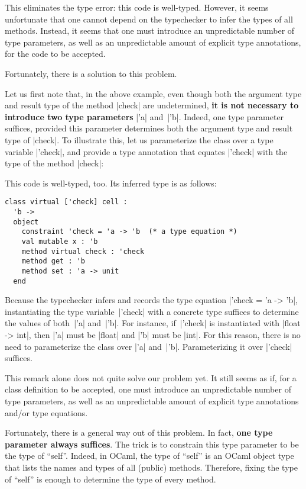 \documentclass[11pt,a4paper,twoside]{article}
\renewcommand{\emph}[1]{\textbf{#1}}
\begin{document}
This eliminates the type error: this code is well-typed. However, it seems
unfortunate that one cannot depend on the typechecker to infer the types of
all methods. Instead, it seems that one must introduce an unpredictable number
of type parameters, as well as an unpredictable amount of explicit type
annotations, for the code to be accepted.

Fortunately, there is a solution to this problem.

Let us first note that, in the above example, even though both the argument
type and result type of the method \oc|check| are undetermined, \emph{it is
  not necessary to introduce two type parameters} \oc|'a| and~\oc|'b|. Indeed,
one type parameter suffices, provided this parameter determines both the
argument type and result type of \oc|check|. To illustrate this, let us
parameterize the class over a type variable \oc|'check|, and provide a type
annotation that equates \oc|'check| with the type of the method \oc|check|:
%

This code is well-typed, too. Its inferred type is as follows:
%
\begin{mdframed}[backgroundcolor=green!10]
\begin{lstlisting}[keywords={}]
class virtual ['check] cell :
  'b ->
  object
    constraint 'check = 'a -> 'b  (* a type equation *)
    val mutable x : 'b
    method virtual check : 'check
    method get : 'b
    method set : 'a -> unit
  end
\end{lstlisting}
\end{mdframed}

Because the typechecker infers and records the type equation %
\oc|'check = 'a -> 'b|, instantiating the type variable~\oc|'check| with a
concrete type suffices to determine the values of both~\oc|'a| and~\oc|'b|.
For instance, if~\oc|'check| is instantiated with \oc|float -> int|, then
\oc|'a| must be \oc|float| and \oc|'b| must be \oc|int|. For this reason,
there is no need to parameterize the class over \oc|'a| and~\oc|'b|.
Parameterizing it over \oc|'check| suffices.

This remark alone does not quite solve our problem yet. It still seems as if,
for a class definition to be accepted, one must introduce an unpredictable
number of type parameters, as well as an unpredictable amount of explicit type
annotations and/or type equations.

Fortunately, there is a general way out of this problem. In fact, \emph{one
  type parameter always suffices}. The trick is to constrain this type
parameter to be the type of ``self''. Indeed, in OCaml, the type of ``self''
is an OCaml object type that lists the names and types of all (public)
methods. Therefore, fixing the type of ``self'' is enough to determine the
type of every method.
\end{document}
